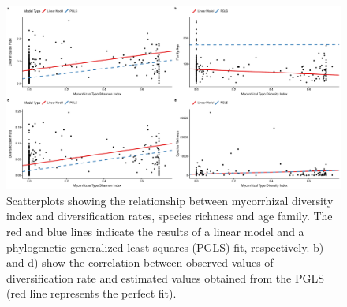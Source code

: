 \documentclass[12pt,]{article}
\begin{document}
\begin{figure}
\centering
\includegraphics{../output/figs/scatterplots_lm_pgls_stem.pdf}
\caption{Scatterplots showing the relationship between mycorrhizal
diversity index and diversification rates, species richness and age
family. The red and blue lines indicate the results of a linear model
and a phylogenetic generalized least squares (PGLS) fit, respectively.
b) and d) show the correlation between observed values of
diversification rate and estimated values obtained from the PGLS (red
line represents the perfect fit).}
\end{figure}
\end{document}
